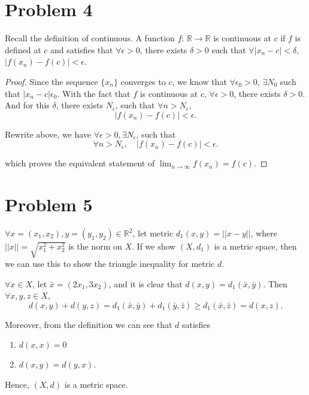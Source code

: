 \documentclass[12pt]{article}
\begin{document}
\section*{Problem 4}

Recall the definition of continuous. A function $f$: $\mathbb{R} \rightarrow \mathbb{R}$ is continuous at $c$ if $f$ is defined at $c$ and satisfies that $\forall \epsilon > 0$, there exists $\delta > 0$ such that $\forall |x_n - c| < \delta$, $|f(x_n) - f(c)| < \epsilon$.

\begin{proof}
Since the sequence $\{x_n\}$ converges to $c$, we know that $\forall \epsilon_0 > 0$, $\exists N_0$ such that $|x_n - c| \epsilon_0$. With the fact that $f$ is continuous at $c$, $\forall \epsilon > 0$, there exists $\delta > 0$. And for this $\delta$, there exists $N_\epsilon$, such that $\forall n > N_\epsilon$, 
$$
|f(x_n) - f(c)| < \epsilon.
$$

Rewrite above, we have $\forall \epsilon > 0, \exists N_\epsilon$, such that 
$$
\forall n > N_\epsilon, \quad |f(x_n) - f(c)| < \epsilon.
$$

which proves the equivalent statement of $\lim_{n\rightarrow \infty} f(x_n) = f(c)$.

\end{proof}


\section*{Problem 5}
$\forall x = (x_1, x_2), y = (y_1, y_2) \in \mathbb{R}^2$, let metric $d_1(x, y) = ||x - y||$, where $||x|| = \sqrt{x_1^2 + x_2^2}$ is the norm on $X$. If we show $(X, d_1)$ is a metric space, then we can use this to show the triangle inequality for metric $d$.

$\forall x\in X$, let $\bar x = (2x_1, 3x_2)$, and it is clear that $d(x, y) = d_1(\bar x, \bar y)$. Then $\forall x, y, z \in X$, 
$$
d(x,y) + d(y, z) = d_1(\bar x, \bar y) + d_1(\bar y, \bar z) \geqslant d_1(\bar x, \bar z) = d(x, z).
$$

Moreover, from the definition we can see that $d$ satisfies 
\begin{enumerate}
\item $d(x, x) = 0$
\item $d(x, y) = d(y, x)$.
\end{enumerate}

Hence, $(X, d)$ is a metric space.
\end{document}
